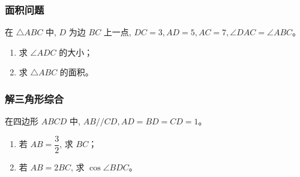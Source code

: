 \subsubsection*{面积问题}

\begin{exercise}[2023 浙江省十校联盟第三次联考第 18 题]
	在 $\triangle ABC$ 中, $D$ 为边 $BC$ 上一点, $DC = 3, AD = 5, AC = 7, \angle DAC = \angle ABC$。
	\begin{enumerate}
		\item[(1)] 求 $\angle ADC$ 的大小；
		\item[(2)] 求 $\triangle ABC$ 的面积。
	\end{enumerate}
\end{exercise}

\subsubsection*{解三角形综合}

\begin{exercise}[2021八省联考]
	在四边形 $ABCD$ 中, $AB//CD, AD=BD=CD=1$。
	\begin{enumerate}
		\item[(1)] 若 $AB = \dfrac{3}{2}$, 求 $BC$；
		\item[(2)] 若 $AB = 2BC$, 求 $\cos\angle BDC$。
	\end{enumerate}
\end{exercise}

\stopexercise
